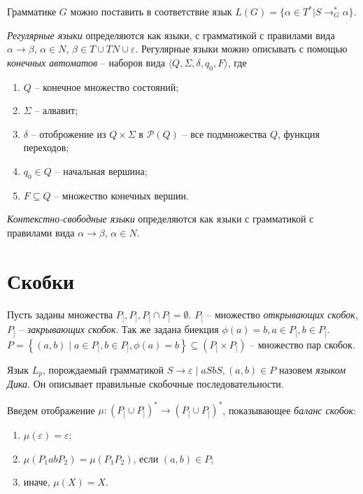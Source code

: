 Грамматике $G$ можно поставить в соответствие язык $L(G) = \{ \alpha \in T^* | S \rightarrow_G^* \alpha \}$. 

\emph{Регулярные языки} определяются как языки, с грамматикой с правилами вида $\alpha \rightarrow \beta$, $\alpha \in N$, $\beta \in T \cup TN \cup \varepsilon$.
Регулярные языки можно описывать с помощью \emph{конечных автоматов} -- наборов вида $\langle Q, \Sigma, \delta, q_0, F \rangle$, где
\begin{enumerate}[label=\arabic*)]
    \item $Q$ -- конечное множество состояний;
    \item $\Sigma$ -- алвавит;
    \item $\delta$ -- отоброжение из $Q \times \Sigma$ в $\mathcal{P} (Q)$ -- все подмножества $Q$, функция переходов;
    \item $q_0 \in Q$ -- начальная вершина;
    \item $F \subseteq Q$ -- множество конечных вершин.
\end{enumerate}

\emph{Контекстно-свободные языки} определяются как языки с грамматикой с правилами вида $\alpha \rightarrow \beta$, $\alpha \in N$. 

\section{Скобки}


Пусть заданы множества $P_[, P_], P_[ \cap P_] = \emptyset$. 
$P_[$ -- множество \emph{открывающих скобок}, $P_]$ -- \emph{закрывающих скобок}.
Так же задана биекция $\phi(a) = b, a \in P_[, b \in P_]$.
$P = \left\{ (a, b) \mid a \in P_[, b \in P_], \phi(a) = b \right\} \subseteq \left( P_[ \times P_] \right)$ -- множество пар скобок.

Язык $L_p$, порождаемый грамматикой $S \rightarrow \varepsilon \mid a S b S, (a, b) \in P$ назовем \emph{языком Дика}. 
Он описывает правильные скобочные последовательности.

Введем отображение $\mu : (P_[ \cup P_])^* \to (P_[ \cup P_])^* $, показывающее \emph{баланс скобок}:
\begin{enumerate}[label=\arabic*)]
    \item $\mu(\varepsilon) = \varepsilon$;
    \item $\mu(P_1 a b P_2) = \mu(P_1 P_2)$, если $(a, b) \in P$;
    \item иначе, $\mu(X) = X$.
\end{enumerate}

